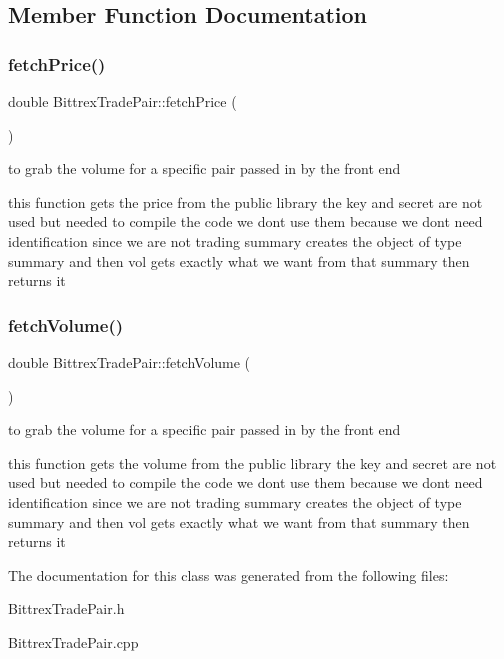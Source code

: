 \subsection{Member Function Documentation}
\mbox{\label{class_bittrex_trade_pair_a74564273a0a56f63a8737fbb4b0dc2e5}} 
\subsubsection{\texorpdfstring{fetch\+Price()}{fetchPrice()}}
{\footnotesize\ttfamily double Bittrex\+Trade\+Pair\+::fetch\+Price (\begin{DoxyParamCaption}{ }\end{DoxyParamCaption})}



to grab the volume for a specific pair passed in by the front end 

this function gets the price from the public library the key and secret are not used but needed to compile the code we dont use them because we dont need identification since we are not trading summary creates the object of type summary and then vol gets exactly what we want from that summary then returns it \mbox{\label{class_bittrex_trade_pair_a314efdd2917c88f48cd521dacf4eed85}} 
\subsubsection{\texorpdfstring{fetch\+Volume()}{fetchVolume()}}
{\footnotesize\ttfamily double Bittrex\+Trade\+Pair\+::fetch\+Volume (\begin{DoxyParamCaption}{ }\end{DoxyParamCaption})}



to grab the volume for a specific pair passed in by the front end 

this function gets the volume from the public library the key and secret are not used but needed to compile the code we dont use them because we dont need identification since we are not trading summary creates the object of type summary and then vol gets exactly what we want from that summary then returns it 

The documentation for this class was generated from the following files\+:\begin{DoxyCompactItemize}
\item 
Bittrex\+Trade\+Pair.\+h\item 
Bittrex\+Trade\+Pair.\+cpp\end{DoxyCompactItemize}
